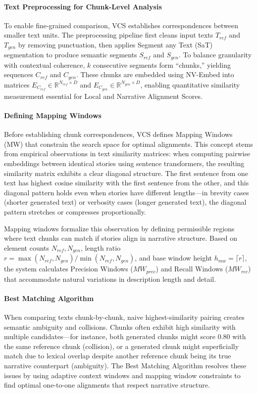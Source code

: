 \documentclass[letterpaper]{article} %
\begin{document}
\paragraph{Text Preprocessing for Chunk-Level Analysis}
To enable fine-grained comparison, VCS establishes correspondences between smaller text units. The preprocessing pipeline first cleans input texts $T_{ref}$ and $T_{gen}$ by removing punctuation, then applies Segment any Text (SaT)~\cite{frohmann2024segment} segmentation to produce semantic segments $S_{ref}$ and $S_{gen}$. To balance granularity with contextual coherence, $k$ consecutive segments form ``chunks,'' yielding sequences $C_{ref}$ and $C_{gen}$. These chunks are embedded using NV-Embed into matrices $E_{C_{ref}} \in \mathbb{R}^{N_{ref} \times D}$ and $E_{C_{gen}} \in \mathbb{R}^{N_{gen} \times D}$, enabling quantitative similarity measurement essential for Local and Narrative Alignment Scores.

\paragraph{Defining Mapping Windows}
Before establishing chunk correspondences, VCS defines Mapping Windows (MW) that constrain the search space for optimal alignments. This concept stems from empirical observations in text similarity matrices: when computing pairwise embeddings between identical stories using sentence transformers, the resulting similarity matrix exhibits a clear diagonal structure. The first sentence from one text has highest cosine similarity with the first sentence from the other, and this diagonal pattern holds even when stories have different lengths—in brevity cases (shorter generated text) or verbosity cases (longer generated text), the diagonal pattern stretches or compresses proportionally.

Mapping windows formalize this observation by defining permissible regions where text chunks can match if stories align in narrative structure. Based on element counts $N_{ref}, N_{gen}$, length ratio $r = \max(N_{ref}, N_{gen}) / \min(N_{ref}, N_{gen})$, and base window height $h_{mw} = \lceil r \rceil$, the system calculates Precision Windows ($MW_{prec}$) and Recall Windows ($MW_{rec}$) that accommodate natural variations in description length and detail.

\paragraph{Best Matching Algorithm}
When comparing texts chunk-by-chunk, naive highest-similarity pairing creates semantic ambiguity and collisions. Chunks often exhibit high similarity with multiple candidates—for instance, both generated chunks might score 0.80 with the same reference chunk (collision), or a generated chunk might superficially match due to lexical overlap despite another reference chunk being its true narrative counterpart (ambiguity). The Best Matching Algorithm resolves these issues by using adaptive context windows and mapping window constraints to find optimal one-to-one alignments that respect narrative structure.
\end{document}
